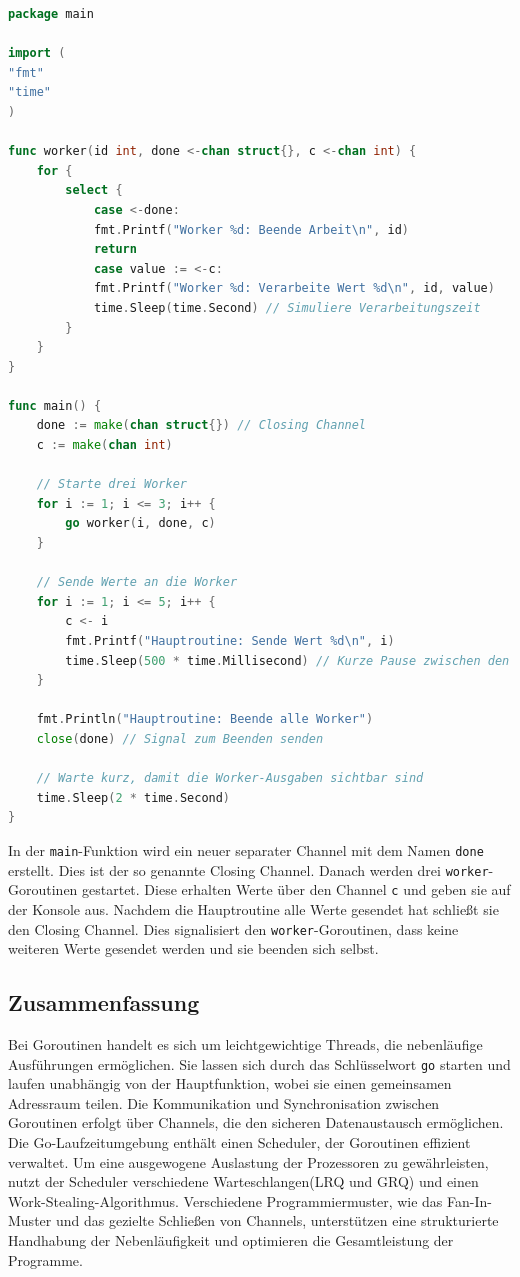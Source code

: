 \documentclass[fontsize=12pt,paper=a4,twoside=semi,parskip=half-,headsepline,headinclude]{scrreprt}
\begin{document}
\begin{lstlisting}[language=Go,extendedchars=true]
package main

import (
"fmt"
"time"
)

func worker(id int, done <-chan struct{}, c <-chan int) {
	for {
		select {
			case <-done:
			fmt.Printf("Worker %d: Beende Arbeit\n", id)
			return
			case value := <-c:
			fmt.Printf("Worker %d: Verarbeite Wert %d\n", id, value)
			time.Sleep(time.Second) // Simuliere Verarbeitungszeit
		}
	}
}

func main() {
	done := make(chan struct{}) // Closing Channel
	c := make(chan int)
	
	// Starte drei Worker
	for i := 1; i <= 3; i++ {
		go worker(i, done, c)
	}
	
	// Sende Werte an die Worker
	for i := 1; i <= 5; i++ {
		c <- i
		fmt.Printf("Hauptroutine: Sende Wert %d\n", i)
		time.Sleep(500 * time.Millisecond) // Kurze Pause zwischen den Sendungen
	}
	
	fmt.Println("Hauptroutine: Beende alle Worker")
	close(done) // Signal zum Beenden senden
	
	// Warte kurz, damit die Worker-Ausgaben sichtbar sind
	time.Sleep(2 * time.Second)
}
\end{lstlisting}

In der \texttt{main}-Funktion wird ein neuer separater Channel mit dem Namen \texttt{done} erstellt. Dies ist der so genannte Closing Channel. Danach werden drei \texttt{worker}-Goroutinen ge\-star\-tet. Diese erhalten Werte über den Channel \texttt{c} und geben sie auf der Konsole aus. Nachdem die Hauptroutine alle Werte gesendet hat schließt sie den Closing Channel. Dies signalisiert den  \texttt{worker}-Goroutinen, dass keine weiteren Werte gesendet werden und sie beenden sich selbst.

\subsection{Zusammenfassung}

Bei Goroutinen handelt es sich um leichtgewichtige Threads, die nebenläufige Ausführungen ermöglichen. Sie lassen sich durch das Schlüsselwort \texttt{go} starten und laufen unabhängig von der Hauptfunktion, wobei sie einen gemeinsamen Adressraum teilen. Die Kommunikation und Synchronisation zwischen Goroutinen erfolgt über Channels, die den sicheren Datenaustausch ermöglichen. Die Go-Laufzeitumgebung enthält einen Scheduler, der Goroutinen effizient verwaltet. Um eine ausgewogene Auslastung der Prozessoren zu gewährleisten, nutzt der Scheduler verschiedene Warteschlangen(LRQ und GRQ) und einen Work-Stealing-Algorithmus. Verschiedene Programmiermuster, wie das Fan-In-Muster und das gezielte Schließen von Channels, unterstützen eine strukturierte Handhabung der Nebenläufigkeit und optimieren die Gesamtleistung der Programme.
\end{document}
